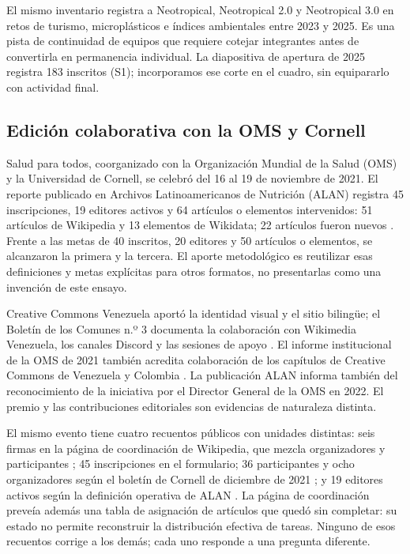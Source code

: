 El mismo inventario registra a Neotropical, Neotropical 2.0 y Neotropical 3.0 en retos de turismo, microplásticos e índices ambientales entre 2023 y 2025. Es una pista de continuidad de equipos que requiere cotejar integrantes antes de convertirla en permanencia individual. La diapositiva de apertura de 2025 registra 183 inscritos (S1); incorporamos ese corte en el cuadro, sin equipararlo con actividad final.

\subsection{Edición colaborativa con la OMS y Cornell}
Salud para todos, coorganizado con la Organización Mundial de la Salud (OMS) y la Universidad de Cornell, se celebró del 16 al 19 de noviembre de 2021. El reporte publicado en Archivos Latinoamericanos de Nutrición (ALAN) registra 45 inscripciones, 19 editores activos y 64 artículos o elementos intervenidos: 51 artículos de Wikipedia y 13 elementos de Wikidata; 22 artículos fueron nuevos \cite{salud}. Frente a las metas de 40 inscritos, 20 editores y 50 artículos o elementos, se alcanzaron la primera y la tercera. El aporte metodológico es reutilizar esas definiciones y metas explícitas para otros formatos, no presentarlas como una invención de este ensayo.

Creative Commons Venezuela aportó la identidad visual y el sitio bilingüe; el Boletín de los Comunes n.º 3 documenta la colaboración con Wikimedia Venezuela, los canales Discord y las sesiones de apoyo \cite{boletincc}. El informe institucional de la OMS de 2021 también acredita colaboración de los capítulos de Creative Commons de Venezuela y Colombia \cite{who2021}. La publicación ALAN informa también del reconocimiento de la iniciativa por el Director General de la OMS en 2022. El premio y las contribuciones editoriales son evidencias de naturaleza distinta.

El mismo evento tiene cuatro recuentos públicos con unidades distintas: seis firmas en la página de coordinación de Wikipedia, que mezcla organizadores y participantes \cite{wpeditathon}; 45 inscripciones en el formulario; 36 participantes y ocho organizadores según el boletín de Cornell de diciembre de 2021 \cite{pin2021}; y 19 editores activos según la definición operativa de ALAN \cite{salud}. La página de coordinación preveía además una tabla de asignación de artículos que quedó sin completar: su estado no permite reconstruir la distribución efectiva de tareas. Ninguno de esos recuentos corrige a los demás; cada uno responde a una pregunta diferente.

